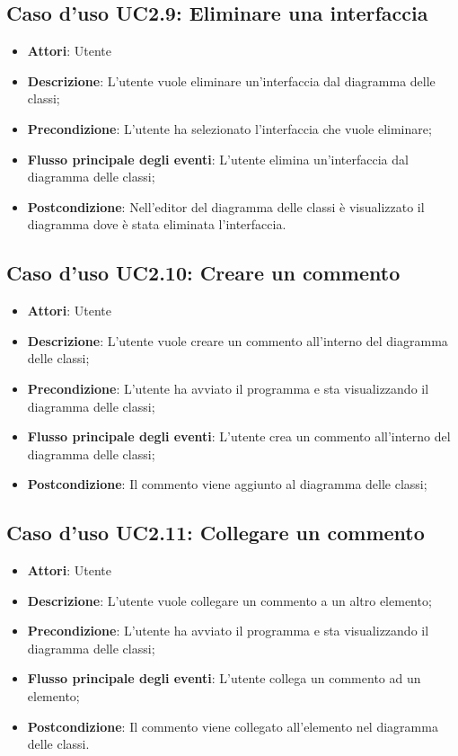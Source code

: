 \documentclass[../AnalisiDeiRequisiti.tex]{subfiles}
\begin{document}
		\subsection{Caso d'uso UC2.9: Eliminare una interfaccia}
		\begin{itemize}
			\item \textbf{Attori}: Utente
			\item \textbf{Descrizione}: L'utente vuole eliminare un'interfaccia dal diagramma delle classi;
			\item \textbf{Precondizione}: L'utente ha selezionato l'interfaccia che vuole eliminare;
			\item \textbf{Flusso principale degli eventi}: L'utente elimina un'interfaccia dal diagramma delle classi;
			\item \textbf{Postcondizione}: Nell'editor del diagramma delle classi è visualizzato il diagramma dove è stata eliminata l'interfaccia.
		\end{itemize}
		\subsection{Caso d'uso UC2.10: Creare un commento}
		\begin{itemize}
			\item \textbf{Attori}: Utente
			\item \textbf{Descrizione}: L'utente vuole creare un commento all'interno del diagramma delle classi;
			\item \textbf{Precondizione}: L'utente ha avviato il programma e sta visualizzando il diagramma delle classi;
			\item \textbf{Flusso principale degli eventi}: L'utente crea un commento all'interno del diagramma delle classi;
			\item \textbf{Postcondizione}: Il commento viene aggiunto al diagramma delle classi;
		\end{itemize}
		\subsection{Caso d'uso UC2.11: Collegare un commento}
		\begin{itemize}
			\item \textbf{Attori}: Utente
			\item \textbf{Descrizione}: L'utente vuole collegare un commento a un altro elemento;
			\item \textbf{Precondizione}: L'utente ha avviato il programma e sta visualizzando il diagramma delle classi;
			\item \textbf{Flusso principale degli eventi}: L'utente collega un commento ad un elemento;
			\item \textbf{Postcondizione}: Il commento viene collegato all'elemento nel diagramma delle classi.
		\end{itemize}
\end{document}
